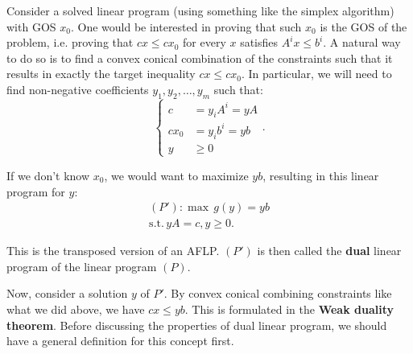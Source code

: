 Consider a solved linear program (using something like the simplex algorithm)
with GOS \( x_{0} \). One would be interested in proving that such \( x_{0} \)
is the GOS of the problem, i.e. proving that \( cx \le  cx_{0} \) for every
\( x \) satisfies \( A^{i}x \le b^{i} \). A natural way to do so is to find a
convex conical combination of the constraints such that it results in exactly
the target inequality \( cx \le  cx_{0} \). In particular, we will need to find
non-negative coefficients \( y_{1}, y_{2}, \ldots , y_{m} \) such that:
\[
  \begin{cases}
    c &= y_{i}A^{i} = yA\\
    cx_{0} &= y_{i}b^{i} = yb\\
    y &\ge 0
  \end{cases}
.\] 

If we don't know \( x_{0} \), we would want to maximize \( yb \), resulting in
this linear program for \( y \):
\begin{align*}
  (P'):  \max\, g(y) = yb\\
  \text{s.t.}\, yA = c, y \ge 0
.\end{align*}

This is the transposed version of an AFLP. \( (P') \) is then called the
\textbf{dual} linear program of the linear program \( (P) \).

Now, consider a solution \( y \) of \( P' \). By convex conical combining
constraints like what we did above, we have \( cx \le yb \). This is formulated
in the \textbf{Weak duality theorem}. Before discussing the properties of dual
linear program, we should have a general definition for this concept first.

